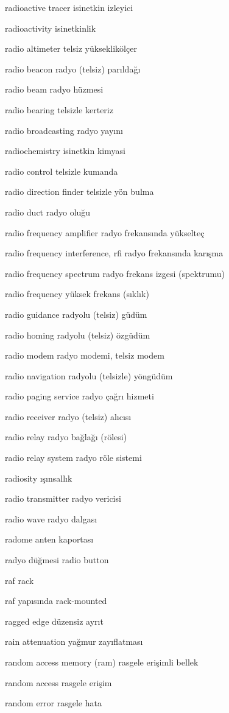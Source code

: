 \documentclass[12pt,fleqn]{article}\usepackage{../../common}
\begin{document}
radioactive tracer isinetkin izleyici

radioactivity isinetkinlik

radio altimeter telsiz yükseklikölçer

radio beacon radyo (telsiz) parıldağı

radio beam radyo hüzmesi

radio bearing telsizle kerteriz

radio broadcasting radyo yayını

radiochemistry isinetkin kimyasi

radio control telsizle kumanda

radio direction finder telsizle yön bulma

radio duct radyo oluğu

radio frequency amplifier radyo frekansında yükselteç

radio frequency interference, rfi radyo frekansında karışma

radio frequency spectrum radyo frekans izgesi (spektrumu)

radio frequency yüksek frekans (sıklık)

radio guidance radyolu (telsiz) güdüm

radio homing radyolu (telsiz) özgüdüm

radio modem radyo modemi, telsiz modem

radio navigation radyolu (telsizle) yöngüdüm

radio paging service radyo çağrı hizmeti

radio receiver radyo (telsiz) alıcısı

radio relay radyo bağlağı (rölesi)

radio relay system radyo röle sistemi

radiosity ışınsallık

radio transmitter radyo vericisi

radio wave radyo dalgası

radome anten kaportası

radyo düğmesi radio button

raf rack

raf yapısında rack-mounted

ragged edge düzensiz ayrıt

rain attenuation yağmur zayıflatması

random access memory (ram) rasgele erişimli bellek

random access rasgele erişim

random error rasgele hata
\end{document}
